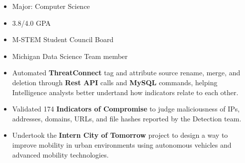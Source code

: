 \documentclass[10pt,a4paper,ragged2e]{altacv}
\begin{document}
\tagline{}

\begin{fullwidth}
\makecvheader
\end{fullwidth}



\begin{itemize}
    \item Major: Computer Science
    \smallskip
    \item 3.8/4.0 GPA
    \smallskip
    \item M-STEM Student Council Board
    \smallskip
    \item Michigan Data Science Team member
\end{itemize}



\begin{itemize}
\item Automated \textbf{ThreatConnect} tag and attribute source rename, merge, and deletion through \textbf{Rest API} calls and \textbf{MySQL} commands, helping Intelligence analysts better undertand how indicators relate to each other.
\smallskip
\item Validated 174 \textbf{Indicators of Compromise} to  judge maliciousness of IPs, addresses, domains, URLs, and file hashes reported by the Detection team.
\smallskip
\item Undertook the \textbf{Intern City of Tomorrow} project to design a way to improve mobility in urban environments using autonomous vehicles and advanced mobility technologies.
\end{itemize}
\end{document}
